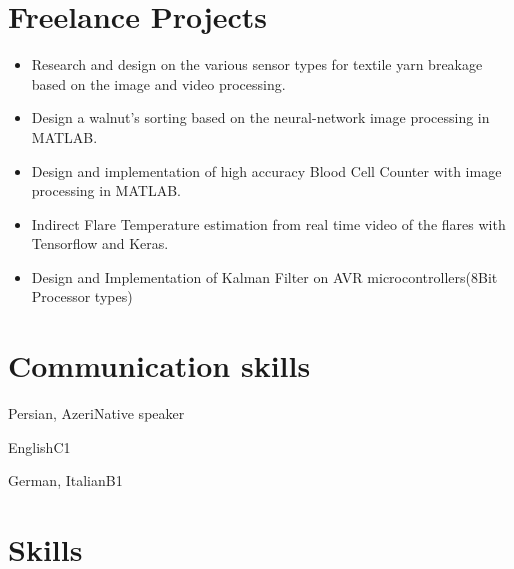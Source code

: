 \documentclass[fontsize=12pt]{tccv}
\begin{document}
	\section{Freelance Projects}
	
    \begin{itemize}
		\item \small Research and design on the various sensor types for textile yarn breakage based on the image and video processing.

		\item \small Design a walnut’s sorting based on the neural-network image processing in MATLAB.
		\item \small Design and implementation of high accuracy Blood Cell Counter with image processing in MATLAB.	
		\item \small Indirect Flare Temperature estimation from real time video of the flares with Tensorflow and Keras.
		\item \small Design and Implementation of Kalman Filter on AVR microcontrollers(8Bit Processor types)
    \end{itemize}
	\vspace{-10mm}
	\section{Communication skills}
	
	\begin{factlist}
		\item{Persian, Azeri}{Native speaker}
		\item{English}{C1}
		\item{German, Italian}{B1}
	\end{factlist}
	\vspace{-10mm}
	\section{Skills}
	
\end{document}
